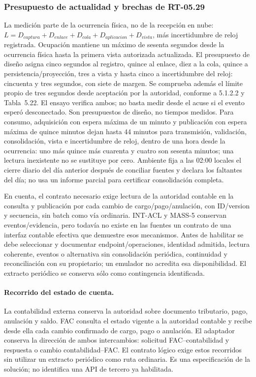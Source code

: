 \subsubsection{Presupuesto de actualidad y brechas de RT-05.29}
\label{subsec:sd5_actualidad29}

La medición parte de la ocurrencia física, no de la recepción en nube: $L=D_{captura}+D_{enlace}+D_{cola}+D_{aplicacion}+D_{vista}$, más incertidumbre de reloj registrada. Ocupación mantiene un máximo de sesenta segundos desde la ocurrencia física hasta la primera vista autorizada actualizada. El presupuesto de diseño asigna cinco segundos al registro, quince al enlace, diez a la cola, quince a persistencia/proyección, tres a vista y hasta cinco a incertidumbre del reloj: cincuenta y tres segundos, con siete de margen. Se comprueba además el límite propio de tres segundos desde aceptación por la autoridad, conforme a 5.1.2.2 y Tabla~5.22. El ensayo verifica ambos; no basta medir desde el acuse si el evento esperó desconectado. Son presupuestos de diseño, no tiempos medidos. Para consumo, adquisición con espera máxima de un minuto y publicación con espera máxima de quince minutos dejan hasta 44 minutos para transmisión, validación, consolidación, vista e incertidumbre de reloj, dentro de una hora desde la ocurrencia: uno más quince más cuarenta y cuatro son sesenta minutos; una lectura inexistente no se sustituye por cero. Ambiente fija a las 02:00 locales el cierre diario del día anterior después de conciliar fuentes y declara los faltantes del día; no usa un informe parcial para certificar consolidación completa.

En cuenta, el contrato necesario exige lectura de la autoridad contable en la consulta y publicación por cada cambio de cargo/pago/anulación, con ID/version y secuencia, sin batch como vía ordinaria. INT-ACL y MASS-5 conservan eventos/evidencia, pero todavía no existe en las fuentes un contrato de una interfaz contable efectiva que demuestre esos mecanismos. Antes de habilitar se debe seleccionar y documentar endpoint/operaciones, identidad admitida, lectura coherente, eventos o alternativa sin consolidación periódica, continuidad y reconciliación con su propietario; un emulador no acredita esa disponibilidad. El extracto periódico se conserva sólo como contingencia identificada.

\paragraph{Recorrido del estado de cuenta.}
La contabilidad externa conserva la autoridad sobre documento tributario, pago, anulación y saldo. FAC consulta el estado vigente a la autoridad contable y recibe desde ella cada cambio confirmado de cargo, pago o anulación. El adaptador conserva la dirección de ambos intercambios: solicitud FAC--contabilidad y respuesta o cambio contabilidad--FAC. El contrato lógico exige estos recorridos sin utilizar un extracto periódico como ruta ordinaria. Es una especificación de la solución; no identifica una API de tercero ya habilitada.

